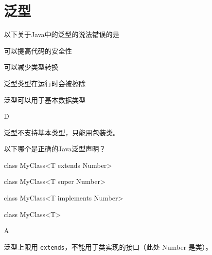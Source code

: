 \section{泛型}

\begin{question}
	以下关于Java中的泛型的说法错误的是
	\begin{options}
		\item 可以提高代码的安全性
		\item 可以减少类型转换
		\item 泛型类型在运行时会被擦除
		\item 泛型可以用于基本数据类型
	\end{options}
	\begin{answer}
		D
	\end{answer}
	\begin{explanation}
		泛型不支持基本类型，只能用包装类。
	\end{explanation}
\end{question}

\begin{question}
	以下哪个是正确的Java泛型声明？
	\begin{options}
		\item class MyClass<T extends Number>
		\item class MyClass<T super Number>
		\item class MyClass<T implements Number>
		\item class MyClass<T>
	\end{options}
	\begin{answer}
		A
	\end{answer}
	\begin{explanation}
		泛型上限用 \texttt{extends}，不能用于类实现的接口（此处 Number 是类）。
	\end{explanation}
\end{question}
